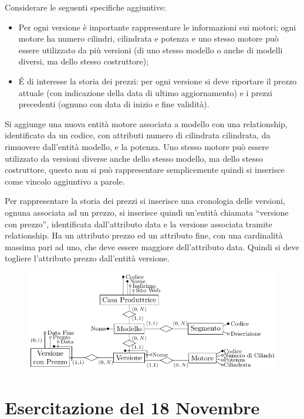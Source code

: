 \documentclass{article}
\numberwithin{equation}{subsection}
\begin{document}
Considerare le seguenti specifiche aggiuntive:
\begin{itemize}
    \item Per ogni versione è importante rappresentare le informazioni sui motori; ogni motore ha numero cilindri, cilindrata e potenza e uno stesso motore può essere 
utilizzato da più versioni (di uno stesso modello o anche di modelli diversi, ma dello stesso costruttore);
    \item \'{E} di interesse la storia dei prezzi: per ogni versione si deve riportare il prezzo attuale (con indicazione della data di ultimo aggiornamento) e i 
prezzi precedenti (ognuno con data di inizio e fine validità). 
\end{itemize}

Si aggiunge una nuova entità motore associata a modello con una relationship, identificato da un codice, con attributi numero di cilindrata cilindrata, da 
rimuovere dall'entità modello, e la potenza. Uno stesso motore può essere utilizzato da versioni diverse anche dello stesso modello, ma dello stesso costruttore, 
questo non si può rappresentare semplicemente quindi si inserisce come vincolo aggiuntivo a parole. 


Per rappresentare la storia dei prezzi si inserisce una cronologia delle versioni, ognuna associata ad un prezzo, si inserisce quindi un'entità 
chiamata ``versione con prezzo'', identificata dall'attributo data e la versione associata tramite relationship. Ha un attributo prezzo ed un 
attributo fine, con una cardinalità massima pari ad uno, che deve essere maggiore dell'attributo data. Quindi si deve togliere l'attributo prezzo 
dall'entità versione. 

\begin{figure}[H]%
    \centering%
    \includegraphics[scale=1.24]{schema_er_es_2_2.pdf}%
\end{figure}

\clearpage

\section{Esercitazione del 18 Novembre}
\end{document}
